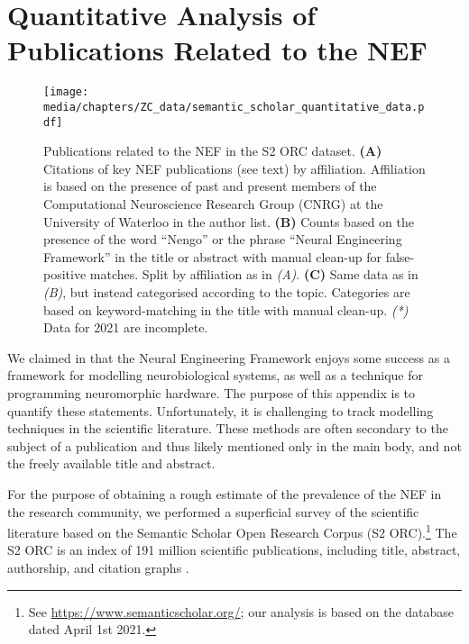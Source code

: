 
\section{Quantitative Analysis of Publications Related to the NEF}
\label{app:nef_literature}

\begin{figure}[p]
	\centering
	\texttt{[image: media/chapters/ZC\_data/semantic\_scholar\_quantitative\_data.pdf]}%
	{\label{fig:nef_literature_a}}%
	{\label{fig:nef_literature_b}}%
	{\label{fig:nef_literature_c}}%
	\caption[Publications related to the NEF in the S2 ORC dataset]{Publications related to the NEF in the S2 ORC dataset.
	\textbf{(A)} Citations of key NEF publications (see text) by affiliation. Affiliation is based on the presence of past and present members of the Computational Neuroscience Research Group (CNRG) at the University of Waterloo in the author list.
	\textbf{(B)} Counts based on the presence of the word \enquote{Nengo} or the phrase \enquote{Neural Engineering Framework} in the title or abstract with manual clean-up for false-positive matches. Split by affiliation as in \emph{(A)}.
	\textbf{(C)} Same data as in \emph{(B)}, but instead categorised according to the topic. Categories are based on keyword-matching in the title with manual clean-up.
	\emph{(*)} Data for 2021 are incomplete.}
	\label{fig:nef_literature}
\end{figure}

We claimed in  that the Neural Engineering Framework enjoys some success as a framework for modelling neurobiological systems, as well as a technique for programming neuromorphic hardware.
The purpose of this appendix is to quantify these statements.
Unfortunately, it is challenging to track modelling techniques in the scientific literature.
These methods are often secondary to the subject of a publication and thus likely mentioned only in the main body, and not the freely available title and abstract.

For the purpose of obtaining a rough estimate of the prevalence of the NEF in the research community, we performed a superficial survey of the scientific literature based on the Semantic Scholar Open Research Corpus (S2 ORC).\footnote{See \url{https://www.semanticscholar.org/}; our analysis is based on the database dated April 1st 2021.}
The S2 ORC is an index of 191 million scientific publications, including title, abstract, authorship, and citation graphs \citep{ammar2018construction}.

